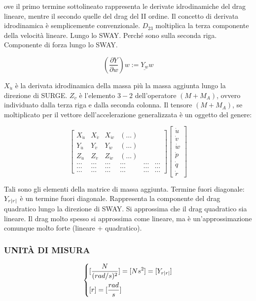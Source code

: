 ove il primo termine sottolineato rappresenta le derivate idrodinamiche del drag lineare, mentre il secondo quelle del drag del II ordine. Il concetto di derivata idrodinamica è semplicemente convenzionale. $D_{23}$ moltiplica la terza componente della velocità lineare. Lungo lo SWAY. Perché sono sulla seconda riga. Componente di forza lungo lo SWAY.

\[
	(\frac{\partial Y}{\partial w})w := \underline{Y_w}w
\]

$X_{\dot{u}}$ è la derivata idrodinamica della massa più la massa aggiunta lungo la direzione di SURGE. $Z_{\dot{v}}$ è l'elemento $3-2$ dell'operatore $(M+M_A)$, ovvero individuato dalla terza riga e dalla seconda colonna. Il tensore $(M+M_A)$, se moltiplicato per il vettore dell'accelerazione generalizzata è un oggetto del genere:

\[
	\begin{bmatrix}X_{\dot{u}}&X_{\dot{v}}&X_{\dot{w}}&(\dots)\\Y_{\dot{u}}&Y_{\dot{v}}&Y_{\dot{w}}&(\dots)\\Z_{\dot{u}}&Z_{\dot{v}}&Z_{\dot{w}}&(\dots)\\\dots&\dots&\dots&\dots&\dots&\dots\\\dots&\dots&\dots&\dots&\dots&\dots\\\dots&\dots&\dots&\dots&\dots&\dots\end{bmatrix}\begin{bmatrix}\dot{u}\\\dot{v}\\\dot{w}\\\dot{p}\\\dot{q}\\\dot{r}\end{bmatrix}
\]

Tali sono gli elementi della matrice di massa aggiunta. Termine fuori diagonale: $Y_{r\lvert r\rvert}$ è un termine fuori diagonale. Rappresenta la componente del drag quadratico lungo la direzione di SWAY. Si approssima che il drag quadratico sia lineare. Il drag molto spesso si approssima come lineare, ma è un'approssimazione comunque molto forte (lineare + quadratico).

\subsubsection{UNIT\`A DI MISURA}

\[
	\left\{
	\begin{aligned}
	&[\frac{N}{(rad/s)^2}] = [Ns^2] = [Y_{r\lvert r\rvert}]\\
	&[r]=[\frac{rad}{s}]
	\end{aligned}
	\right.
\]

